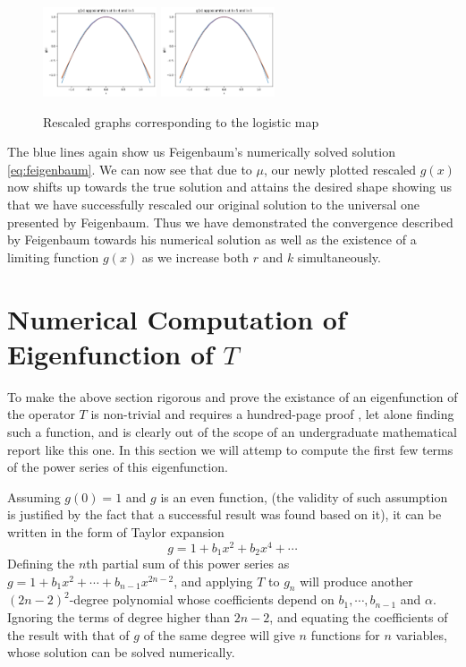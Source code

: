\begin{exmp}
\begin{figure}
    \includegraphics[width=0.3\textwidth]{Feigenbaum Approx Graphs/k=4.png}
    \includegraphics[width=0.3\textwidth]{Feigenbaum Approx Graphs/k=5.png}
    \caption{Rescaled graphs corresponding to the logistic map}
    \label{fig:rescaled}
\end{figure}
The blue lines again show us Feigenbaum's numerically solved solution \eqref{eq:feigenbaum}. We can now see that due to $\mu$, our newly plotted rescaled $g(x)$ now shifts up towards the true solution and attains the desired shape showing us that we have successfully rescaled our original solution to the universal one presented by Feigenbaum. Thus we have demonstrated the convergence described by Feigenbaum towards his numerical solution as well as the existence of a limiting function $g(x)$ as we increase both $r$ and $k$ simultaneously. 
\end{exmp}


\section{Numerical Computation of Eigenfunction of $T$}

To make the above section rigorous and prove the existance of an eigenfunction of the operator $T$ is non-trivial and requires a hundred-page proof \cite{lyubich1999feigenbaum}, let alone finding such a function, and is clearly out of the scope of an undergraduate mathematical report like this one. 
In this section we will attemp to compute the first few terms of the power series of this eigenfunction.

Assuming $g(0) = 1$ and $g$ is an even function, (the validity of such assumption is justified by the fact that a successful result was found based on it), it can be written in the form of Taylor expansion 
$$
g = 1 + b_1 x^2 + b_2x^4 + \cdots 
$$
Defining the $n$th partial sum of this power series as $g = 1 + b_1x^2 + \cdots + b_{n-1}x^{2n-2}$, and applying $T$ to $g_n$ will produce another $(2n-2)^2$-degree polynomial whose coefficients depend on $b_1, \cdots, b_{n-1}$ and $\alpha$.
Ignoring the terms of degree higher than $2n-2$, and equating the coefficients of the result with that of $g$ of the same degree will give $n$ functions for $n$ variables, whose solution can be solved numerically. 


